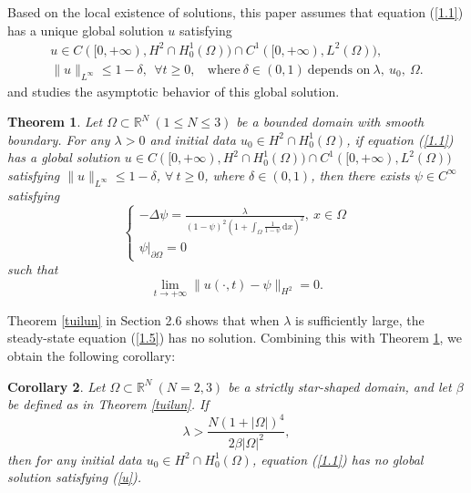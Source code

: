\documentclass{article}
\numberwithin{equation}{section}
\newtheorem{theorem}{Theorem}[section]
\newtheorem{corollary}[theorem]{Corollary}
\begin{document}
Based on the local existence of solutions, this paper assumes that equation (\ref{1.1}) has a unique global solution $u$ satisfying
\begin{equation}
    \begin{aligned}
        u\in C([0,+\infty),H^2\cap H_0^1(\Omega))\cap C^1([0,+\infty),L^2(\Omega)),\quad\ \ \\
        \|u\|_{L^\infty}\le 1-\delta,\ \ \forall t\ge 0,\ \ \ \  \text{where}\ \delta\in(0,1)\ \text{depends on}\ \lambda,\ u_0,\ \Omega.
    \end{aligned}\label{u}
\end{equation}
and studies the asymptotic behavior of this global solution.

\begin{theorem}\label{theorem1.1}
  Let $\Omega\subset\mathbb{R}^{N}\ (1\le N\le 3)$ be a bounded domain with smooth boundary. For any $\lambda>0$ and initial data $u_0\in H^2\cap H_0^1(\Omega)$, if equation (\ref{1.1}) has a global solution $u\in C([0,+\infty),H^2\cap H_0^1(\Omega))\cap C^1([0,+\infty),L^2(\Omega))$ satisfying $\|u\|_{L^\infty}\le 1-\delta$, $\forall \ t\ge 0$, where $\delta\in (0,1)$, then there exists $\psi\in C^\infty$ satisfying
  \begin{equation}
      \begin{cases}
          -\Delta\psi=\frac{\lambda}{(1-\psi)^2(1+\int_{\Omega}\frac{1}{1-\psi}\,\mathrm{d}x)^2},\ x\in\Omega \\
          \psi |_{\partial\Omega}=0 \label{1.5}
      \end{cases}
  \end{equation}
  such that
  \begin{equation}
      \lim_{t \to +\infty} \|u(\cdot,t)-\psi\|_{H^2}=0. \label{1.6}
  \end{equation}
\end{theorem}

Theorem \ref{tuilun} in Section 2.6 shows that when $\lambda$ is sufficiently large, the steady-state equation (\ref{1.5}) has no solution. Combining this with Theorem \ref{theorem1.1}, we obtain the following corollary:

\begin{corollary}\label{tuilun1}
Let $\Omega\subset\mathbb{R}^{N}\ (N=2,3)$ be a strictly star-shaped domain, and let $\beta$ be defined as in Theorem \ref{tuilun}. If $$\lambda>\frac{N(1+|\Omega|)^4}{2\beta |\Omega|^2},$$
then for any initial data $u_0\in H^2\cap H_0^1(\Omega)$, equation (\ref{1.1}) has no global solution satisfying (\ref{u}).
\end{corollary}
\end{document}
